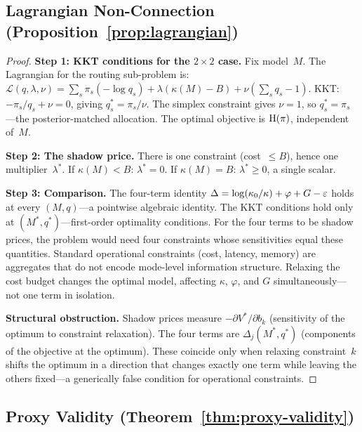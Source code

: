 \subsection{Lagrangian Non-Connection (Proposition~\ref{prop:lagrangian})}
\label{app:lagrangian}

\begin{proof}
\noindent\textbf{Step 1: KKT conditions for the $2 \times 2$ case.}
Fix model~$M$.
The Lagrangian for the routing sub-problem is:
$\mathcal{L}(q,\lambda,\nu) = \sum_s \pi_s(-\log q_s) + \lambda(\kappa(M)-B) + \nu(\sum_s q_s - 1)$.
KKT: $-\pi_s/q_s + \nu = 0$, giving $q_s^* = \pi_s/\nu$.
The simplex constraint gives $\nu = 1$, so $q_s^* = \pi_s$---the posterior-matched allocation.
The optimal objective is $\mathrm{H}(\pi)$, independent of~$M$.

\noindent\textbf{Step 2: The shadow price.}
There is one constraint (cost~$\le B$), hence one multiplier~$\lambda^*$.
If $\kappa(M) < B$: $\lambda^* = 0$.
If $\kappa(M) = B$: $\lambda^* \ge 0$, a single scalar.

\noindent\textbf{Step 3: Comparison.}
The four-term identity $\Delta = \log(\kappa_0/\kappa) + \varphi + G - \varepsilon$ holds at every $(M,q)$---a pointwise algebraic identity.
The KKT conditions hold only at $(M^*,q^*)$---first-order optimality conditions.
For the four terms to be shadow prices, the problem would need four constraints whose sensitivities equal these quantities.
Standard operational constraints (cost, latency, memory) are aggregates that do not encode mode-level information structure.
Relaxing the cost budget changes the optimal model, affecting $\kappa$, $\varphi$, and $G$ simultaneously---not one term in isolation.

\noindent\textbf{Structural obstruction.}
Shadow prices measure $-\partial V^*/\partial b_k$ (sensitivity of the optimum to constraint relaxation).
The four terms are $\Delta_j(M^*,q^*)$ (components of the objective at the optimum).
These coincide only when relaxing constraint~$k$ shifts the optimum in a direction that changes exactly one term while leaving the others fixed---a generically false condition for operational constraints.
\end{proof}

\subsection{Proxy Validity (Theorem~\ref{thm:proxy-validity})}
\label{app:proxy}

